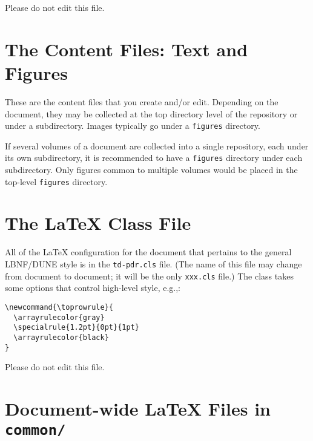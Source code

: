 Please do not edit this file.

\section{The Content Files: Text and Figures}
\label{sec:tech-contentfiles}

These are the content files that you create and/or edit. Depending on the document, they may be 
collected at the top directory level of the repository or under a subdirectory. Images typically go under a \texttt{figures} directory.  

If several volumes of a document are collected into a single repository, each under its own subdirectory, it is recommended to have a \texttt{figures} directory under each subdirectory. Only figures common to multiple volumes would be placed in the top-level \texttt{figures} directory.

\section{The \LaTeX{} Class File}
\label{sec:tech-classfile}

All of the \LaTeX{} configuration for the document that pertains to
the general LBNF/DUNE style is in the
\texttt{td-pdr.cls} file. (The name of this file may change from document to document; it will be the only \texttt{xxx.cls} file.)
The class takes some options that control high-level style, e.g.,:

\begin{verbatim}
\newcommand{\toprowrule}{
  \arrayrulecolor{gray}
  \specialrule{1.2pt}{0pt}{1pt}
  \arrayrulecolor{black}
}
\end{verbatim}

Please do not edit this file.

\section{Document-wide \LaTeX{} Files in \texttt{common/}}
\label{sec:tech-common}

